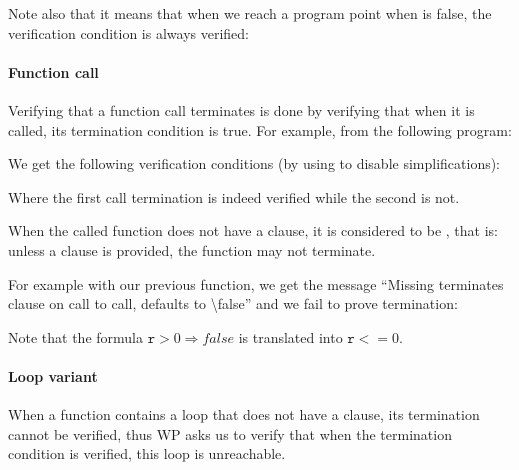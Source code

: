 Note also that it means that when we reach a program point when 
is false, the verification condition is always verified:






\paragraph{Function call}



Verifying that a function call terminates is done by verifying that when it is
called, its termination condition is true. For example, from the following
program:





We get the following verification conditions (by using 
to disable simplifications):






Where the first call termination is indeed verified while the second is not.


When the called function does not have a  clause, it
is considered to be , that is: unless a
 clause is provided, the function may not terminate.


For example with our previous  function, we get the message
``Missing terminates clause on call to call, defaults to \textbackslash{}false''
and we fail to prove termination:




Note that the formula $\mathtt{r} > 0 \Rightarrow false$ is translated into
$\mathtt{r} <= 0$.


\paragraph{Loop variant}



When a function contains a loop that does not have a 
clause, its termination cannot be verified, thus WP asks us to verify that when
the termination condition is verified, this loop is unreachable.



